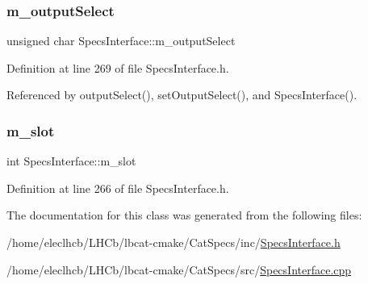 \subsubsection{\texorpdfstring{m\+\_\+output\+Select}{m\_outputSelect}}
{\footnotesize\ttfamily unsigned char Specs\+Interface\+::m\+\_\+output\+Select\hspace{0.3cm}{\ttfamily [protected]}}



Definition at line 269 of file Specs\+Interface.\+h.



Referenced by output\+Select(), set\+Output\+Select(), and Specs\+Interface().

\mbox{\label{classSpecsInterface_a7030d3ba54c826b3524f72e57b82ece6}} 
\subsubsection{\texorpdfstring{m\+\_\+slot}{m\_slot}}
{\footnotesize\ttfamily int Specs\+Interface\+::m\+\_\+slot\hspace{0.3cm}{\ttfamily [private]}}



Definition at line 266 of file Specs\+Interface.\+h.



The documentation for this class was generated from the following files\+:\begin{DoxyCompactItemize}
\item 
/home/eleclhcb/\+L\+H\+Cb/lbcat-\/cmake/\+Cat\+Specs/inc/\hyperlink{SpecsInterface_8h}{Specs\+Interface.\+h}\item 
/home/eleclhcb/\+L\+H\+Cb/lbcat-\/cmake/\+Cat\+Specs/src/\hyperlink{SpecsInterface_8cpp}{Specs\+Interface.\+cpp}\end{DoxyCompactItemize}
